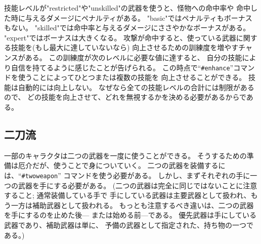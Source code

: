 技能レベルが"restricted"や"unskilled"の武器を使うと、怪物への命中率や
命中した時に与えるダメージにペナルティがある。
"basic"ではペナルティもボーナスもない。
"skilled"では命中率と与えるダメージにささやかなボーナスがある。
"expert"ではボーナスは大きくなる。
攻撃が命中すると、使っている武器に関する技能を(もし最大に達していないなら)
向上させるための訓練度を増やすチャンスがある。
この訓練度が次のレベルに必要な値に達すると、
自分の技能により自信を持てるように感じたことが告げられる。
この時点で``{\tt \#enhance}''コマンドを使うことによってひとつまたは複数の技能を
向上させることができる。
技能は自動的には向上しない。
なぜなら全ての技能レベルの合計には制限があるので、
どの技能を向上させて、どれを無視するかを決める必要があるからである。

\subsection*{二刀流}

一部のキャラクタは二つの武器を一度に使うことができる。
そうするための準備は厄介だが、使うことで身についていく。
二つの武器を装備するには、``{\tt \#twoweapon}'' コマンドを使う必要がある。
しかし、まずそれぞれの手に一つの武器を手にする必要がある。
(二つの武器は完全に同じではないことに注意すること; 通常装備している手で
手にしている武器は主要武器として扱われ、もう一方は補助武器として扱われる。
もっとも注意するべき違いは、二つの武器を手にするのを止めた後---
または始める前---である。
優先武器は手にしている武器であり、補助武器は単に、
予備の武器として指定された、持ち物の一つである。)

